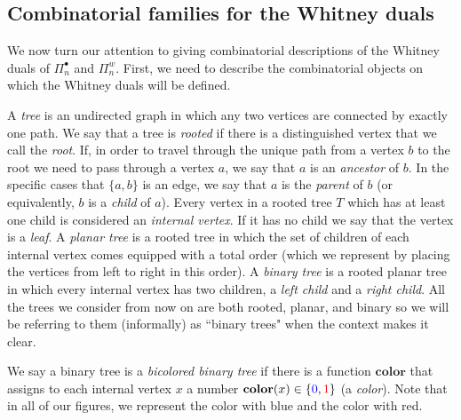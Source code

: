 \documentclass[11pt]{article}
\theoremstyle{definition}
\numberwithin{equation}{section}
\newcommand{\clr}{\mathbf{color}}
\newcommand{\tre}[1]{{\color{red}{#1}}}
\newcommand{\tbl}[1]{{\color{blue}{#1}}}
\begin{document}
\subsection{Combinatorial families for the Whitney duals} \label{section:combinatorial_families}
We now turn our attention to giving combinatorial descriptions of the Whitney duals of $\Pi_n^\bullet$ and $\Pi_n^w$. First, we need to describe the combinatorial objects on which the Whitney duals will be defined. 

A \emph{tree} is an undirected graph in which any two vertices are connected by exactly one path. We say that a tree is \emph{rooted} if there is a distinguished vertex that we call the \emph{root}.  If, in order to travel through the unique path from a vertex $b$ to the root we need to pass through a vertex $a$, we say that $a$ is an \emph{ancestor} of $b$. In the specific cases that $\{a,b\}$ is an edge, we say that $a$ is the \emph{parent} of $b$ (or equivalently, $b$ is a \emph{child} of $a$). Every vertex in a rooted tree $T$ which has at least one child is considered an \emph{internal vertex}. If it has no child we say that the vertex is a \emph{leaf}. A \emph{planar tree} is a rooted tree in which the set of children of each internal vertex comes equipped with a total order (which we represent by placing the vertices from left to right in this order). A \emph{binary tree} is a rooted planar tree in which every internal vertex has two children, a \emph{left child} and a \emph{right child}.  All the trees we consider from now on are both rooted, planar, and binary so we will be referring to them (informally) as ``binary trees" when the context makes it clear.

We say a binary tree is a \emph{bicolored binary tree} if there is a function $\clr$ that assigns to each internal vertex $x$ a number $\clr(x)\in \{\tbl{0},\tre{1}\}$ (a \emph{color}).  Note that in all of our figures, we represent the color \tbl{0} with blue and the color \tre{1} with red. 
\end{document}
